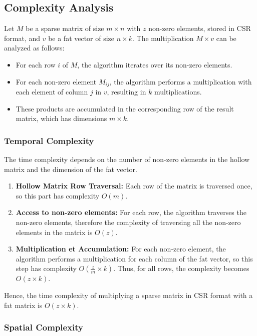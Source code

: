 \documentclass[12pt,oneside]{book} %
\begin{document}
\subsection{Complexity Analysis}
Let \( M \) be a sparse matrix of size \( m \times n \) with \( z \) non-zero
elements, stored in CSR format, and \( v \) be a fat vector of size \( n \times
k \). The multiplication \( M \times v \) can be analyzed as follows:

\begin{itemize}
    \item For each row \( i \) of \( M \), the algorithm iterates over its non-zero
          elements.
    \item For each non-zero element \( M_{ij} \), the algorithm performs a multiplication
          with each element of column \( j \) in \( v \), resulting in \( k \)
          multiplications.
    \item These products are accumulated in the corresponding row of the result matrix,
          which has dimensions \( m \times k \).
\end{itemize}

\subsubsection{Temporal Complexity}
The time complexity depends on the number of non-zero elements in the hollow
matrix and the dimension of the fat vector.

\begin{enumerate}
    \item \textbf{Hollow Matrix Row Traversal:} Each row of the matrix is traversed once, so this part has complexity \( O(m) \).
    \item \textbf{Access to non-zero elements:} For each row, the algorithm traverses the non-zero elements, therefore the complexity of traversing all the non-zero elements in the matrix is \( O(z) \).
    \item \textbf{Multiplication et Accumulation:} For each non-zero element, the algorithm performs a multiplication for each column of the fat vector, so this step has complexity \( O(\frac{z}{m} \times k) \). Thus, for all rows, the complexity becomes  \( O(z \times k) \).
\end{enumerate}

Hence, the time complexity of multiplying a sparse matrix in CSR format with a
fat matrix is \( O(z \times k) \).

\subsubsection{Spatial Complexity}
\end{document}
